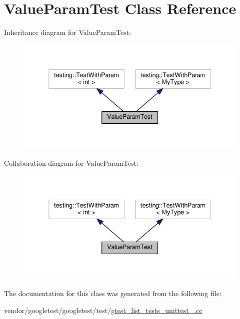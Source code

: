 \hypertarget{classValueParamTest}{}\section{Value\+Param\+Test Class Reference}
\label{classValueParamTest}


Inheritance diagram for Value\+Param\+Test\+:
\nopagebreak
\begin{figure}[H]
\begin{center}
\leavevmode
\includegraphics[width=338pt]{classValueParamTest__inherit__graph}
\end{center}
\end{figure}


Collaboration diagram for Value\+Param\+Test\+:
\nopagebreak
\begin{figure}[H]
\begin{center}
\leavevmode
\includegraphics[width=338pt]{classValueParamTest__coll__graph}
\end{center}
\end{figure}


The documentation for this class was generated from the following file\+:\begin{DoxyCompactItemize}
\item 
vendor/googletest/googletest/test/\hyperlink{gtest__list__tests__unittest___8cc}{gtest\+\_\+list\+\_\+tests\+\_\+unittest\+\_\+.\+cc}\end{DoxyCompactItemize}
